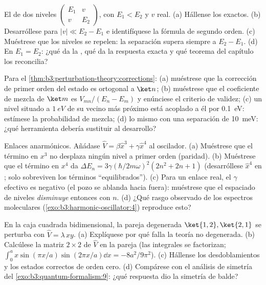 \begin{exercise}[$\star$]\label{exo:b3:perturbation-theory:3}
El  de dos niveles $\begin{pmatrix}E_1 & v\\ v &
E_2\end{pmatrix}$, con $E_1 < E_2$ y $v$ real. (a) Hállense los  exactos. (b) Desarróllese para $|v| \ll E_2 - E_1$ e identifíquese la
fórmula de segundo orden. (c) Muéstrese que los niveles se repelen: la
separación supera siempre a $E_2 - E_1$. (d) En $E_1 = E_2$: ¿qué da la
, qué da la respuesta exacta y qué teorema del
capítulo los reconcilia?
\end{exercise}

\begin{exercise}[$\star$]\label{exo:b3:perturbation-theory:4}
Para el \cref{thm:b3:perturbation-theory:corrections}: (a) muéstrese que la
corrección de primer orden del estado es ortogonal a $\ket n$; (b) muéstrese
que el coeficiente de mezcla de $\ket m$ es $V_{mn}/(E_n - E_m)$ y
enúnciese el criterio de validez; (c) un nivel situado a $\qty{1}{eV}$ de su
vecino más próximo está acoplado a él por \qty{0.1}{eV}: estímese la
probabilidad de mezcla; (d) lo mismo con una separación de \qty{10}{meV}:
¿qué herramienta debería sustituir al desarrollo?
\end{exercise}

\begin{exercise}[$\star\star$]\label{exo:b3:perturbation-theory:5}
Enlaces anarmónicos. Añádase $\hat V = \beta\hat x^3 + \gamma\hat x^4$ al
oscilador. (a) Muéstrese que el término en $x^3$ no desplaza ningún nivel a
primer orden (paridad). (b) Muéstrese que el término en $x^4$ da $\Delta E_n =
3\gamma(\hbar/2m\omega)^2(2n^2 + 2n + 1)$ (desarróllese $\hat x^4$ en
; solo sobreviven los términos ``equilibrados''). (c) Para un enlace real, el $\gamma$ efectivo es negativo (el pozo se
ablanda hacia fuera): muéstrese que el espaciado de niveles \emph{disminuye}
entonces con $n$.
(d) ¿Qué rasgo observado de los espectros moleculares
(\cref{exo:b3:harmonic-oscillator:4}) reproduce esto?
\end{exercise}

\begin{exercise}[$\star\star$]\label{exo:b3:perturbation-theory:6}
En la caja cuadrada bidimensional, la pareja degenerada $\ket{1,2},
\ket{2,1}$ se perturba con $\hat V = \lambda\,xy$. (a) Explíquese por qué
falla la teoría no degenerada. (b) Calcúlese la matriz $2\times2$ de
$\hat V$ en la pareja (las integrales se factorizan; $\int_0^a
x\sin(\pi x/a)\sin(2\pi x/a)\dd x = -8a^2/9\pi^2$). (c) Hállense los
desdoblamientos y los estados correctos de orden cero. (d) Compárese con
el análisis de simetría del \cref{exo:b3:quantum-formalism:9}: ¿qué
respuesta dio la simetría de balde?
\end{exercise}

